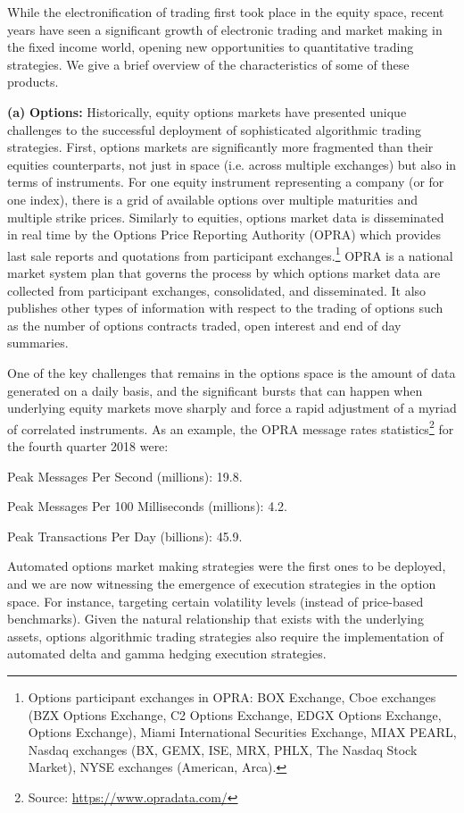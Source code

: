 While the electronification of trading first took place in the equity space, recent years have seen a significant growth of electronic trading and market making in the fixed income world, opening new opportunities to quantitative trading strategies. We give a brief overview of the characteristics of some of these products. \twomedskip


\noindent\textbf{(a)} \textbf{Options:} Historically, equity options markets have presented unique challenges to the successful deployment of sophisticated algorithmic trading strategies. First, options markets are significantly more fragmented than their equities counterparts, not just in space (i.e. across multiple exchanges) but also in terms of instruments. For one equity instrument representing a company (or for one index), there is a grid of available options over multiple maturities and multiple strike prices. Similarly to equities, options market data is disseminated in real time by the Options Price Reporting Authority (OPRA) which provides last sale reports and quotations from participant exchanges.\footnote{Options participant exchanges in OPRA: BOX Exchange, Cboe exchanges (BZX Options Exchange, C2 Options Exchange, EDGX Options Exchange, Options Exchange), Miami International Securities Exchange, MIAX PEARL, Nasdaq exchanges (BX, GEMX, ISE, MRX, PHLX, The Nasdaq Stock Market), NYSE exchanges (American, Arca).} OPRA is a national market system plan that governs the process by which options market data are collected from participant exchanges, consolidated, and disseminated. It also publishes other types of information with respect to the trading of options such as the number of options contracts traded, open interest and end of day summaries. 


One of the key challenges that remains in the options space is the amount of data generated on a daily basis, and the significant bursts that can happen when underlying equity markets move sharply and force a rapid adjustment of a myriad of correlated instruments. As an example, the OPRA message rates statistics\footnote{Source: \url{https://www.opradata.com/}} for the fourth quarter 2018 were: \twomedskip

\noindent Peak Messages Per Second (millions): 19.8.

\noindent Peak Messages Per 100 Milliseconds (millions): 4.2.

\noindent Peak Transactions Per Day (billions): 45.9. \twomedskip


Automated options market making strategies were the first ones to be deployed, and we are now witnessing the emergence of execution strategies in the option space. For instance, targeting certain volatility levels (instead of price-based benchmarks). Given the natural relationship that exists with the underlying assets, options algorithmic trading strategies also require the implementation of automated delta and gamma hedging execution strategies.


